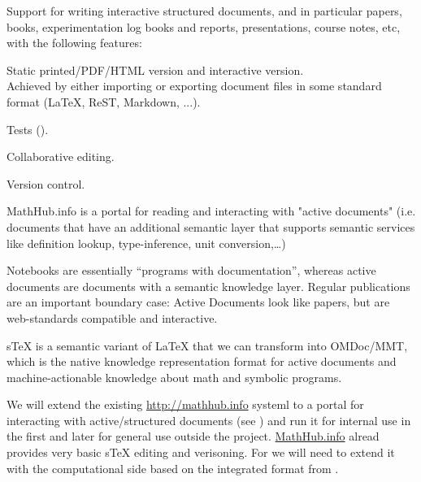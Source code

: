 \begin{workpackage}
\begin{tasklist}
\begin{task}[title=Structured documents,id=structdocs,lead=JU,PM=24]
  Support for writing interactive structured documents, and in
  particular papers, books, experimentation log books and reports,
  presentations, course notes, etc, with the following features:
  \begin{compactitem}
  \item Static printed/PDF/HTML version and interactive version.\\
    Achieved by either importing or exporting document files in some
    standard format (LaTeX, ReST, Markdown, ...).
  \item Tests ().
  \item Collaborative editing.
  \item Version control.
  \end{compactitem}
  MathHub.info is a portal for reading and interacting with "active documents"
  (i.e. documents that have an additional semantic layer that supports semantic services
  like definition lookup, type-inference, unit conversion,\ldots)

  Notebooks are essentially ``programs with documentation'', whereas active documents are
  documents with a semantic knowledge layer. Regular publications are an important
  boundary case: Active Documents look like papers, but are web-standards compatible and
  interactive.

  sTeX is a semantic variant of LaTeX that we can transform into OMDoc/MMT, which is the
  native knowledge representation format for active documents and machine-actionable
  knowledge about math and symbolic programs.
\end{task}

\begin{task}[id=mathhub,title=Active Documents Portal,lead=JU,PM=12]
  We will extend the existing \url{http://mathhub.info} systeml to a portal for
  interacting with active/structured documents (see ) and run it
  for internal use in the \TheProject first and later for general use outside the
  project. \url{MathHub.info} alread provides very basic sTeX editing and verisoning. For
  \TheProject we will need to extend it with the computational side based on the
  integrated format from .
\end{task}


\end{tasklist}
\end{workpackage}
